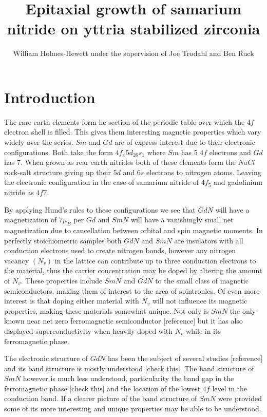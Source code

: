 \documentclass[11pt]{article}
\begin{document}
\title{Epitaxial growth of samarium nitride on yttria stabilized zirconia}
\author{William Holmes-Hewett under the supervision of Joe Trodahl and Ben Ruck}
\maketitle




\twocolumn
\sloppy

\section{Introduction}
The rare earth elements form he section of the periodic table over which the $4f$ electron shell is filled. This gives them interesting magnetic properties which vary widely over the series. $Sm$ and $Gd$ are of express interest due to their electronic configurations. Both take the form $4f_x5d_26s_1$ where $Sm$ has 5 $4f$ electrons and $Gd$ has 7. When grown as rear earth nitrides both of these elements form the $NaCl$ rock-salt structure giving up their $5d$ and $6s$ electrons to nitrogen atoms. Leaving the electronic configuration in the case of samarium nitride of $4f_5$ and gadolinium nitride as $4f7$.

By applying Hund's rules to these configurations we see that $GdN$ will have a magnetization of $7\mu_B$ per $Gd$ and $SmN$ will have a vanishingly small net magnetization due to cancellation between orbital and spin magnetic moments. In perfectly stoichiometric samples both $GdN$ and $SmN$ are insulators with all conduction electrons used to create nitrogen bonds, however any nitrogen vacancy $(N_v)$ in the lattice can contribute up to three conduction electrons to the material, thus the carrier concentration may be doped by altering the amount of $N_v$. These properties include $SmN$ and $GdN$ to the small class of magnetic semiconductors, making them of interest to the area of spintronics. Of even more interest is that doping either material with $N_v$ will not influence  its magnetic properties, making these materials somewhat unique. Not only is $SmN$ the only known near net zero ferromagnetic semiconductor [reference] but it has also displayed superconductivity when heavily doped with $N_v$ while in its ferromagnetic phase.

The electronic structure of $GdN$ has been the subject of several studies [reference] and its band structure is mostly understood [check this]. The band structure of $SmN$ however is much less understood, particularity the band gap in the ferromagnetic phase [check this] and the location of the lowest $4f$ level in the conduction band. If a clearer picture of the band structure of $SmN$ were provided some of its more interesting and unique properties may be able to be understood.
\end{document}
